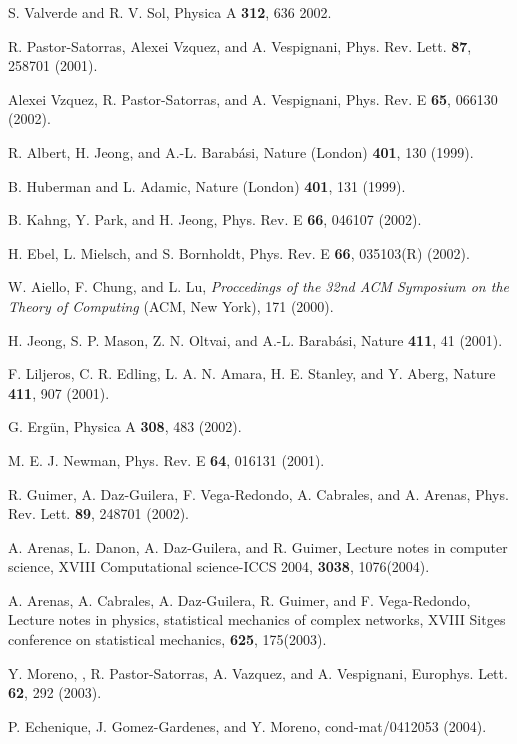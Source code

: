 \documentclass[aps,prl,twocolumn,superscriptaddress,showpacs]{revtex4}
\begin{document}
\begin{references}
S. Valverde and R. V. Sol, Physica A {\bf 312}, 636 {2002}.

R. Pastor-Satorras, Alexei Vzquez, and A. Vespignani,
Phys. Rev. Lett. {\bf 87}, 258701 (2001).

Alexei Vzquez, R. Pastor-Satorras, and A. Vespignani,
Phys. Rev. E {\bf 65}, 066130 (2002).

R. Albert, H. Jeong, and A.-L. Barab\'{a}si, Nature (London) {\bf 401},
130 (1999).

B. Huberman and L. Adamic, Nature (London) {\bf 401}, 131 (1999).

B. Kahng, Y. Park, and H. Jeong,
Phys. Rev. E {\bf 66}, 046107 (2002).

H. Ebel, L. Mielsch, and S. Bornholdt,
Phys. Rev. E {\bf 66}, 035103(R) (2002).

W. Aiello, F. Chung, and L. Lu, {\it Proccedings of the 32nd ACM Symposium
on the Theory of Computing} (ACM, New York), 171 (2000).

H. Jeong, S. P. Mason, Z. N. Oltvai, and A.-L. Barab\'{a}si,
Nature {\bf 411}, 41 (2001).

F. Liljeros, C. R. Edling, L. A. N. Amara, H. E. Stanley, and Y. Aberg,
Nature {\bf 411}, 907 (2001).

G. Erg\"{u}n, Physica A {\bf 308}, 483 (2002).

M. E. J. Newman, Phys. Rev. E {\bf 64}, 016131 (2001).

R. Guimer, A. Daz-Guilera, F. Vega-Redondo,
A. Cabrales, and A. Arenas, Phys. Rev. Lett. {\bf 89}, 248701
(2002).

A. Arenas, L. Danon, A. Daz-Guilera, and R.
Guimer, Lecture notes in computer science, XVIII
Computational science-ICCS 2004, {\bf 3038}, 1076(2004).

A. Arenas, A. Cabrales, A. Daz-Guilera, R.
Guimer, and F. Vega-Redondo, Lecture notes in physics,
statistical mechanics of complex networks, XVIII Sitges conference
on statistical mechanics, {\bf 625}, 175(2003).

Y. Moreno, , R. Pastor-Satorras, A. Vazquez, and A. Vespignani,
Europhys. Lett. {\bf 62}, 292 (2003).

P. Echenique, J. Gomez-Gardenes, and Y. Moreno, cond-mat/0412053
(2004).


\end{references}
\end{document}
